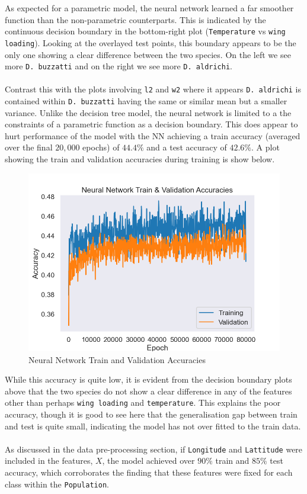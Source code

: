 \documentclass{article}
\begin{document}
As expected for a parametric model, the neural network learned a far smoother function than the non-parametric counterparts. This is indicated by the continuous decision boundary in the bottom-right plot (\texttt{Temperature} vs \texttt{wing loading}). Looking at the overlayed test points, this boundary appears to be the only one showing a clear difference between the two species. On the left we see more \texttt{D. buzzatti} and on the right we see more \texttt{D. aldrichi}. \\
\\
Contrast this with the plots involving \texttt{l2} and \texttt{w2} where it appears \texttt{D. aldrichi} is contained within \texttt{D. buzzatti} having the same or similar mean but a smaller variance. Unlike the decision tree model, the neural network is limited to a the constraints of a parametric function as a decision boundary. This does appear to hurt performance of the model with the NN achieving a train accuracy (averaged over the final $20,000$ epochs) of $44.4\%$ and a test accuracy of $42.6\%$. A plot showing the train and validation accuracies during training is show below.

\begin{figure}[htb]
    \centering
    \includegraphics[width=0.6\columnwidth]{plots/nn_train_val_accuracies.png}
    \caption{Neural Network Train and Validation Accuracies}
    \label{fig:nn_train_val_acc}
\end{figure}

\newpage
While this accuracy is quite low, it is evident from the decision boundary plots above that the two species do not show a clear difference in any of the features other than perhaps \texttt{wing loading} and \texttt{temperature}. This explains the poor accuracy, though it is good to see here that the generalisation gap between train and test is quite small, indicating the model has not over fitted to the train data. \\
\\
As discussed in the data pre-processing section, if \texttt{Longitude} and \texttt{Lattitude} were included in the features, $X$, the model achieved over $90\%$ train and $85\%$ test accuracy, which corroborates the finding that these features were fixed for each class within the \texttt{Population}.
\end{document}

